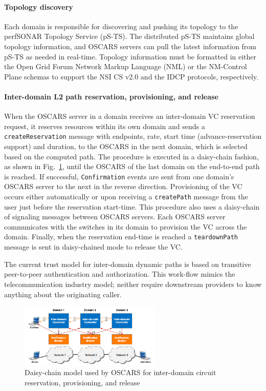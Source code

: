 \paragraph{Topology discovery}
Each domain is responsible for discovering and pushing its topology to the perfSONAR Topology Service (pS-TS). The distributed pS-TS maintains
global topology information, and OSCARS servers can pull
the latest information from pS-TS as needed in real-time.
Topology information must be formatted in either the Open
Grid Forum Network Markup Language (NML) \cite{van2013network} or the NM-Control Plane \cite{IDCP} schemas to support the NSI CS v2.0
and the IDCP protocols, respectively.

\paragraph{Inter-domain L2 path reservation, provisioning, and
release}
When the OSCARS server in a domain receives an inter-domain VC reservation request, it reserves resources within its
own domain and sends a \texttt{createReservation} message
with endpoints, rate, start time (advance-reservation support)
and duration, to the OSCARS in the next domain, which is
selected based on the computed path. The procedure is executed in a daisy-chain fashion, as shown in Fig.~\ref{fig:daisychain},
until the OSCARS of the last domain on
the end-to-end path is reached. If successful, \texttt{Confirmation}
events are sent from one domain’s OSCARS server to the next
in the reverse direction. Provisioning of the VC occurs either
automatically or upon receiving a \texttt{createPath} message
from the user just before the reservation start-time. This procedure also uses a daisy-chain of signaling messages between
OSCARS servers. Each OSCARS server communicates with
the switches in its domain to provision the VC across the
domain. Finally, when the reservation end-time is reached a
\texttt{teardownPath} message is sent in daisy-chained mode to
release the VC.

The current trust model for inter-domain dynamic paths is based on transitive peer-to-peer authentication and authorization. This work-flow mimics the telecommunication industry model; neither require downstream providers to know anything about the originating caller.
\begin{figure}
\centering
\includegraphics[width=0.6\textwidth]{figures/daisychain.png}
\caption{Daisy-chain model used by OSCARS for inter-domain circuit reservation, provisioning, and release}
\label{fig:daisychain}
\end{figure}

